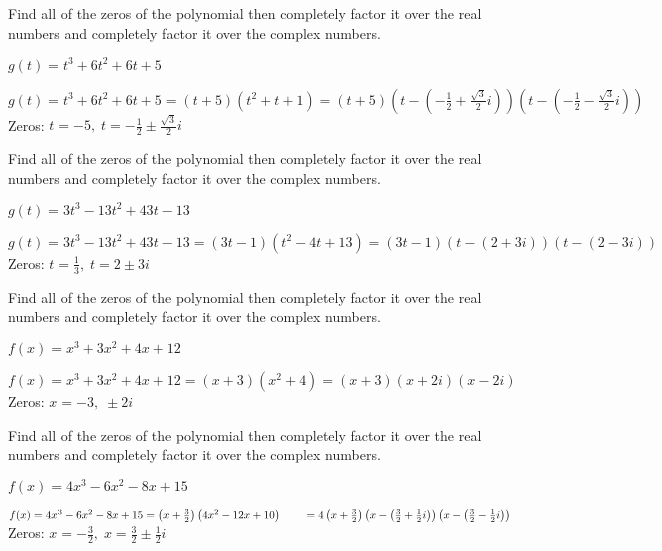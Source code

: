 \documentclass{ximera}
\begin{document}
\begin{problem}
Find all of the zeros of the polynomial then completely factor it over the real numbers and completely factor it over the complex numbers.

$g(t) = t^{3} + 6t^{2} + 6t + 5$

\begin{solution}
 $g(t) = t^{3} + 6t^{2} + 6t + 5 = (t + 5)(t^{2} + t + 1) = (t + 5) \left( t - \left( -\frac{1}{2} + \frac{\sqrt{3}}{2}i \right) \right) \left( t - \left(-\frac{1}{2} - \frac{\sqrt{3}}{2}i \right) \right)$ \\
Zeros: $t = -5, \;  t = -\frac{1}{2} \pm \frac{\sqrt{3}}{2}i $
\end{solution}

\end{problem}

\begin{problem}
Find all of the zeros of the polynomial then completely factor it over the real numbers and completely factor it over the complex numbers.

$g(t) = 3t^{3} - 13t^{2} + 43t - 13$

\begin{solution}
$g(t) = 3t^{3} - 13t^{2} + 43t - 13 = (3t - 1)(t^{2} - 4t + 13) = (3t - 1)(t - (2 + 3i))(t - (2 - 3i))$\\
Zeros: $t = \frac{1}{3}, \; t = 2 \pm 3i$
\end{solution}

\end{problem}

\begin{problem}
Find all of the zeros of the polynomial then completely factor it over the real numbers and completely factor it over the complex numbers.

$f(x) = x^3 + 3x^2 + 4x + 12$

\begin{solution}
$f(x) = x^3 + 3x^2 + 4x + 12 = (x+3) \left(x^2 + 4 \right) = (x+3)(x+2i)(x-2i)$ \\
Zeros:  $x = -3, \; \pm 2i$
\end{solution}
\end{problem}

\begin{problem}
Find all of the zeros of the polynomial then completely factor it over the real numbers and completely factor it over the complex numbers.

$f(x) = 4x^3-6x^2-8x+15$

\begin{solution}
$f(x) = 4x^3-6x^2-8x+15 = \left(x + \frac{3}{2} \right) \left(4x^2-12x+10\right) \\
 \phantom{f(x)} = 4 \left(x + \frac{3}{2} \right) \left(x - \left( \frac{3}{2} + \frac{1}{2}i  \right) \right) \left(x - \left( \frac{3}{2} - \frac{1}{2}i  \right) \right)$\\
Zeros:  $x = - \frac{3}{2}, \; x = \frac{3}{2} \pm \frac{1}{2}i$
\end{solution}

\end{problem}
\end{document}
